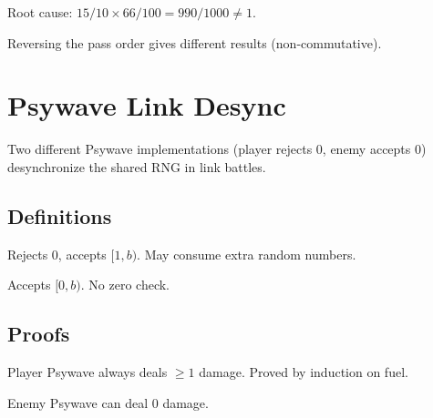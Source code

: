 \begin{theorem}\label{thm:ratio_product}
  \leanok
  Root cause: $15/10 \times 66/100 = 990/1000 \neq 1$.
\end{theorem}

\begin{theorem}\label{thm:order_matters}
  \leanok
  Reversing the pass order gives different results (non-commutative).
\end{theorem}

\chapter{Psywave Link Desync}\label{ch:psywave}

Two different Psywave implementations (player rejects 0, enemy accepts 0)
desynchronize the shared RNG in link battles.

\section{Definitions}

\begin{definition}\label{def:psywave_player}
  \leanok
  Rejects 0, accepts $[1, b)$. May consume extra random numbers.
\end{definition}

\begin{definition}\label{def:psywave_enemy}
  \leanok
  Accepts $[0, b)$. No zero check.
\end{definition}

\section{Proofs}

\begin{theorem}\label{thm:player_never_zero}
  \leanok
  Player Psywave always deals $\ge 1$ damage. Proved by induction on fuel.
\end{theorem}

\begin{theorem}\label{thm:enemy_can_deal_zero}
  \leanok
  Enemy Psywave can deal 0 damage.
\end{theorem}

